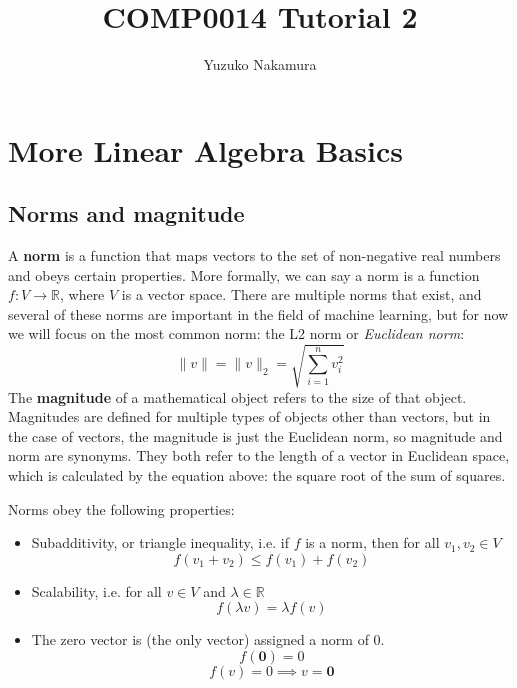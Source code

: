 \documentclass[12pt]{article}
\title{COMP0014 Tutorial 2}
\author{Yuzuko Nakamura}
\date{}
\begin{document}
\maketitle

\section*{More Linear Algebra Basics}
\subsection*{Norms and magnitude}
A \textbf{norm} is a function that maps vectors to the set of non-negative real numbers and obeys certain properties. More formally, we can say a norm is a function $f: V \rightarrow \mathbb{R}$, where $V$ is a vector space. There are multiple norms that exist, and several of these norms are important in the field of machine learning, but for now we will focus on the most common norm: the L2 norm or \textit{Euclidean norm}:
\begin{equation}
    \| v\| = \|v\|_2 = \sqrt{\sum_{i=1}^{n}v_i^2}
\end{equation}
The \textbf{magnitude} of a mathematical object refers to the size of that object. Magnitudes are defined for multiple types of objects other than vectors, but in the case of vectors, the magnitude is just the Euclidean norm, so magnitude and norm are synonyms. They both refer to the length of a vector in Euclidean space, which is calculated by the equation above: the square root of the sum of squares.

Norms obey the following properties:
\begin{itemize}
    \item Subadditivity, or triangle inequality, i.e. if $f$ is a norm, then for all $v_{1}, v_{2} \in V$
    \begin{equation}
        f(v_{1} + v_{2}) \leq f(v_{1}) + f(v_{2})
    \end{equation}
    \item Scalability, i.e. for all $v \in V$ and $\lambda \in \mathbb{R}$
    \begin{equation}
        f(\lambda v) = \lambda f(v)
    \end{equation}
    \item The zero vector is (the only vector) assigned a norm of 0.
    \begin{equation}
        f(\textbf{0}) = 0
    \end{equation}
    \begin{equation}
        f(v) = 0 \implies v = \textbf{0}
    \end{equation}
\end{itemize}
\end{document}
